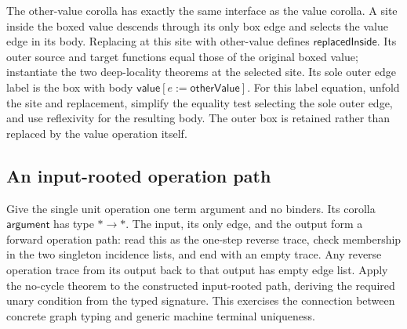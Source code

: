 The other-value corolla has exactly the same interface as the value corolla.
A site inside the boxed value descends through its only box edge and selects the
value edge in its body. Replacing at this site with other-value defines
$\mathsf{replacedInside}$.
Its outer source and target functions equal those of the original boxed value;
instantiate the two deep-locality theorems at the selected site. Its sole outer
edge label is the box with body $\mathsf{value}[e:=\mathsf{otherValue}]$.
For this label equation, unfold the site and replacement, simplify the equality
test selecting the sole outer edge, and use reflexivity for the resulting body.
The outer box is retained rather than replaced by the value operation itself.

\subsection{An input-rooted operation path}
Give the single unit operation one term argument and no binders. Its corolla
$\mathsf{argument}$ has type $*\to *$. The input, its only edge, and the output
form a forward operation path: read this as the one-step reverse trace, check
membership in the two singleton incidence lists, and end with an empty trace.
Any reverse operation trace from its output back to that output has empty edge
list. Apply the no-cycle theorem to the constructed input-rooted path, deriving
the required unary condition from the typed signature. This exercises the
connection between concrete graph typing and generic machine terminal uniqueness.

